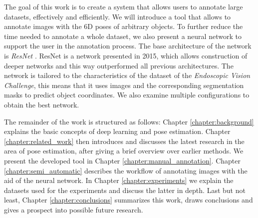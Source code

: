 The goal of this work is to create a system that allows users to annotate large datasets, effectively and efficiently. We will introduce a tool that allows to annotate images with the 6D poses of arbitrary objects. To further reduce the time needed to annotate a whole dataset, we also present a neural network to support the user in the annotation process. The base architecture of the network is \textit{ResNet} \cite{resnet}. ResNet is a network presented in 2015, which allows construction of deeper networks and this way outperformed all previous architectures. The network is tailored to the characteristics of the dataset of the \textit{Endoscopic Vision Challenge}, this means that it uses images and the corresponding segmentation masks to predict object coordinates. We also examine multiple configurations to obtain the best network.

The remainder of the work is structured as follows: Chapter \ref{chapter:background} explains the basic concepts of deep learning and pose estimation. Chapter \ref{chapter:related_work} then introduces and discusses the latest research in the area of pose estimation, after giving a brief overview over earlier methods. We present the developed tool in Chapter \ref{chapter:manual_annotation}. Chapter \ref{chapter:semi_automatic} describes the workflow of annotating images with the aid of the neural network. In Chapter \ref{chapter:experiments} we explain the datasets used for the experiments and discuss the latter in depth. Last but not least, Chapter \ref{chapter:conclusions} summarizes this work, draws conclusions and gives a prospect into possible future research.